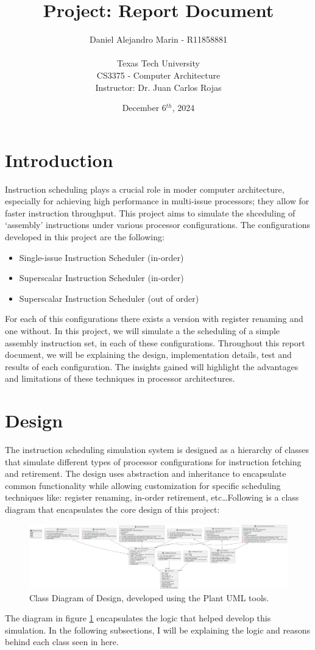 \documentclass{article}
\title{Project: Report Document}
\author{Daniel Alejandro Marin - R11858881\\ \\ Texas Tech University \\CS3375 - Computer Architecture \\ Instructor: Dr. Juan Carlos Rojas}
\date{December 6$^{th}$, 2024}
\begin{document}
\maketitle
\tableofcontents
\newpage
\section{Introduction}
Instruction scheduling plays a crucial role in moder computer architecture, especially for achieving high performance in multi-issue processors; they allow for faster instruction throughput. This project aims to simulate the shceduling of `assembly' instructions under various processor configurations. The configurations developed in this project are the following:
\begin{itemize}
    \item Single-issue Instruction Scheduler (in-order)
    \item Superscalar Instruction Scheduler (in-order)
    \item Superscalar Instruction Scheduler (out of order) 
\end{itemize}

\indent For each of this configurations there exists a version with register renaming and one without. In this project, we will simulate a the scheduling of a simple assembly instruction set, in each of these configurations.
\newline
\indent Throughout this report document, we will be explaining the design, implementation details, test and results of each configuration. The insights gained will highlight the advantages and limitations of these techniques in processor architectures. 
\section{Design}
The instruction scheduling simulation system is designed as a hierarchy of classes that simulate different types of processor configurations for instruction fetching and retirement. The design uses abstraction and inheritance to encapsulate common functionality while allowing customization for specific scheduling techniques like: register renaming, in-order retirement, etc\ldots Following is a class diagram that encapsulates the core design of this project:
\begin{figure}[H]
    \centering
    \includegraphics[width=1\textwidth]{ClassDiagram.png}  
    \caption{Class Diagram of Design, developed using the Plant UML tools.}  
    \label{fig:ClassDiagram}
\end{figure}
The diagram in figure \ref{fig:ClassDiagram} encapsulates the logic that helped develop this simulation. In the following subsections, I will be explaining the logic and reasons behind each class seen in here.
\end{document}
